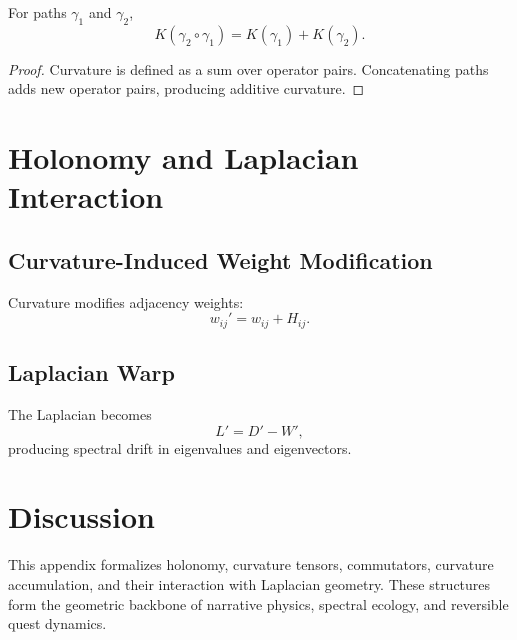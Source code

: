\begin{theorem}
For paths $\gamma_1$ and $\gamma_2$,
\[
K(\gamma_2 \circ \gamma_1) = K(\gamma_1) + K(\gamma_2).
\]
\end{theorem}

\begin{proof}
Curvature is defined as a sum over operator pairs. Concatenating paths
adds new operator pairs, producing additive curvature.
\end{proof}

\section{Holonomy and Laplacian Interaction}

\subsection{Curvature-Induced Weight Modification}
Curvature modifies adjacency weights:
\[
w_{ij}' = w_{ij} + H_{ij}.
\]

\subsection{Laplacian Warp}
The Laplacian becomes
\[
L' = D' - W',
\]
producing spectral drift in eigenvalues and eigenvectors.

\section{Discussion}
This appendix formalizes holonomy, curvature tensors, commutators,
curvature accumulation, and their interaction with Laplacian geometry.
These structures form the geometric backbone of narrative physics,
spectral ecology, and reversible quest dynamics.
